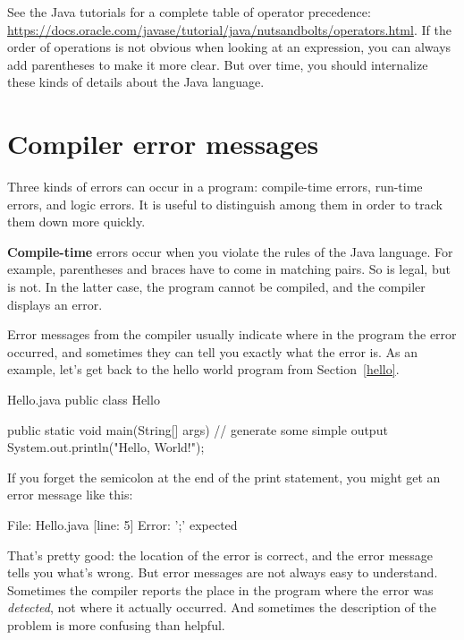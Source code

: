 See the Java tutorials for a complete table of operator precedence: \url{https://docs.oracle.com/javase/tutorial/java/nutsandbolts/operators.html}.
If the order of operations is not obvious when looking at an expression, you can always add parentheses to make it more clear.
But over time, you should internalize these kinds of details about the Java language.


\section{Compiler error messages}


Three kinds of errors can occur in a program: compile-time errors, run-time errors, and logic errors.
It is useful to distinguish among them in order to track them down more quickly.


{\bf Compile-time} errors occur when you violate the rules of the Java language.
For example, parentheses and braces have to come in matching pairs.
So  is legal, but  is not.
In the latter case, the program cannot be compiled, and the compiler displays an error.


Error messages from the compiler usually indicate where in the program the error occurred, and sometimes they can tell you exactly what the error is.
As an example, let's get back to the hello world program from Section~\ref{hello}.

\begin{trinket}[235]{Hello.java}
public class Hello {

    public static void main(String[] args) {
        // generate some simple output
        System.out.println("Hello, World!");
    }
}
\end{trinket}


If you forget the semicolon at the end of the print statement, you might get an error message like this:

\begin{stdout}
File: Hello.java  [line: 5]
Error: ';' expected
\end{stdout}

That's pretty good: the location of the error is correct, and the error message tells you what's wrong.
But error messages are not always easy to understand.
Sometimes the compiler reports the place in the program where the error was {\em detected}, not where it actually occurred.
And sometimes the description of the problem is more confusing than helpful.


